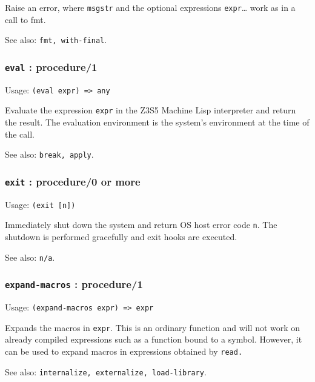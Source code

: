 \documentclass[
]{article}
\newcommand{\passthrough}[1]{#1}
\begin{document}
Raise an error, where \passthrough{\lstinline!msgstr!} and the optional
expressions \passthrough{\lstinline!expr!}\ldots{} work as in a call to
fmt.

See also: \passthrough{\lstinline!fmt, with-final!}.

\hypertarget{eval-procedure1}{%
\subsubsection{\texorpdfstring{\texttt{eval} :
procedure/1}{eval : procedure/1}}\label{eval-procedure1}}

Usage: \passthrough{\lstinline!(eval expr) => any!}

Evaluate the expression \passthrough{\lstinline!expr!} in the Z3S5
Machine Lisp interpreter and return the result. The evaluation
environment is the system's environment at the time of the call.

See also: \passthrough{\lstinline!break, apply!}.

\hypertarget{exit-procedure0-or-more}{%
\subsubsection{\texorpdfstring{\texttt{exit} : procedure/0 or
more}{exit : procedure/0 or more}}\label{exit-procedure0-or-more}}

Usage: \passthrough{\lstinline!(exit [n])!}

Immediately shut down the system and return OS host error code
\passthrough{\lstinline!n!}. The shutdown is performed gracefully and
exit hooks are executed.

See also: \passthrough{\lstinline!n/a!}.

\hypertarget{expand-macros-procedure1}{%
\subsubsection{\texorpdfstring{\texttt{expand-macros} :
procedure/1}{expand-macros : procedure/1}}\label{expand-macros-procedure1}}

Usage: \passthrough{\lstinline!(expand-macros expr) => expr!}

Expands the macros in \passthrough{\lstinline!expr!}. This is an
ordinary function and will not work on already compiled expressions such
as a function bound to a symbol. However, it can be used to expand
macros in expressions obtained by \passthrough{\lstinline!read.!}

See also:
\passthrough{\lstinline!internalize, externalize, load-library!}.
\end{document}
